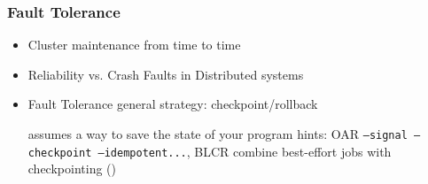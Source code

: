 \documentclass[t]{beamer}
\begin{document}
\begin{frame}[t]
    \frametitle{Fault Tolerance} %

    \begin{itemize}
      \item<+-> Cluster maintenance from time to time
      \item<+-> Reliability vs. Crash Faults in Distributed systems
      \item<+-> Fault Tolerance general strategy: checkpoint/rollback
        \begin{itemize}
            \itemhook assumes a way to save the state of your program
            \itemhook hints: OAR \texttt{--signal --checkpoint --idempotent...}, BLCR
            \itemhook combine best-effort jobs with checkpointing ()
        \end{itemize}
    \end{itemize}

\end{frame}





\end{document}
